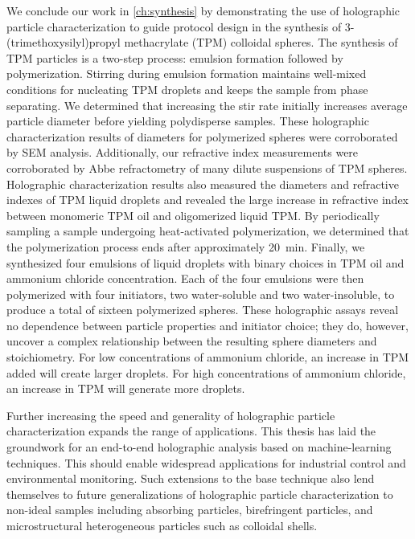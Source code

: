 We conclude our work in \autoref{ch:synthesis} by demonstrating the use of holographic
particle characterization to guide protocol design in the synthesis of
3-(trimethoxysilyl)propyl methacrylate (TPM) colloidal spheres.
The synthesis of TPM particles is a two-step process: emulsion formation followed by
polymerization. Stirring during emulsion formation maintains well-mixed conditions for
nucleating TPM droplets and keeps the sample from phase separating. We determined
that increasing the stir rate initially increases average particle diameter
before yielding polydisperse samples. These holographic characterization results
of diameters for polymerized spheres were corroborated by SEM analysis. Additionally,
our refractive index measurements were corroborated by Abbe refractometry of many
dilute suspensions of TPM spheres. Holographic characterization results also measured
the diameters and refractive indexes of TPM liquid droplets and revealed the large
increase in refractive index between monomeric TPM oil and oligomerized liquid TPM.
By periodically sampling a sample undergoing heat-activated polymerization, we
determined that the polymerization process ends after approximately \SI{20}{\minute}.
Finally, we synthesized four emulsions of liquid droplets with
binary choices in TPM oil and ammonium chloride concentration. Each of the four
emulsions were then polymerized with four initiators, two water-soluble and two
water-insoluble, to produce a total of sixteen polymerized spheres.
These holographic assays reveal no dependence between particle properties and initiator choice;
they do, however, uncover a complex relationship between the resulting sphere diameters
and stoichiometry. For low concentrations of ammonium chloride,
an increase in TPM added will create larger droplets. For high concentrations of ammonium
chloride, an increase in TPM will generate more droplets.

Further increasing the speed and generality of holographic particle characterization
expands the range of applications. This thesis has laid the groundwork for
an end-to-end holographic analysis based on machine-learning techniques. This
should enable widespread applications for industrial control and environmental
monitoring. Such extensions to the base technique also lend themselves to
future generalizations of holographic particle characterization to non-ideal
samples including absorbing particles, birefringent particles, and
microstructural heterogeneous particles such as colloidal shells.




